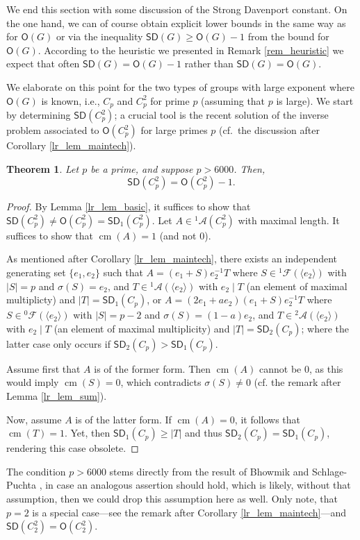 \documentclass{amsart}
\newtheorem{thm}{Theorem}[section]
\theoremstyle{definition}
\numberwithin{equation}{section}
\begin{document}
We end this section with some discussion of the Strong Davenport constant.
On the one hand, we can of course obtain explicit lower bounds in the
same way as for ${\mathsf{O}}(G)$ or via the inequality ${\mathsf{SD}}(G)\ge {\mathsf{O}}(G)-1$
from the bound for ${\mathsf{O}}(G)$.
According to the heuristic we presented in Remark \ref{rem_heuristic} we expect that
often ${\mathsf{SD}}(G)= {\mathsf{O}}(G)-1$ rather than ${\mathsf{SD}}(G)={\mathsf{O}}(G)$.

We elaborate on this point for the two types of groups with large exponent
where ${\mathsf{O}}(G)$ is known, i.e., $C_p$ and $C_p^2$ for prime $p$ (assuming that $p$ is large).
We start by determining ${\mathsf{SD}}(C_p^2)$; a crucial tool is the
recent solution of the inverse problem associated to
${\mathsf{O}}(C_p^2)$ for large primes $p$ (cf.~the discussion after Corollary \ref{lr_lem_maintech}).

\begin{thm}
Let $p$ be a prime, and suppose $p>6000$.
Then,
\[{\mathsf{SD}}(C_p^2)= {\mathsf{O}}(C_p^2)-1.\]
\end{thm}
\begin{proof}
By Lemma \ref{lr_lem_basic}, it suffices to show that
${\mathsf{SD}}(C_p^2)\neq {\mathsf{O}}(C_p^2)={\mathsf{SD}}_1(C_p^2)$.
Let $A\in {{}^{{1}}\!\mathcal{A}}(C_p^2)$ with maximal length.
It suffices to show that $\operatorname{cm}(A)=1$ (and not $0$).

As mentioned after Corollary \ref{lr_lem_maintech}, there exists an independent
generating set $\{ e_1, e_2\}$
such that $A= (e_1 + S)e_2^{-1}T$ where $S \in {{}^{{1}}\!\mathcal{F}}( \langle e_2 \rangle )$
with $|S|=p$ and $\sigma(S)=e_2$, and
$T\in {{}^{{1}}\!\mathcal{A}}(\langle e_2 \rangle)$ with $e_2\mid T$ (an element of maximal multiplicty) and $|T|={\mathsf{SD}}_1(C_p)$,
or $A=(2e_1+ae_2)(e_1+S)e_2^{-1}T$ where
$S \in {{}^{{0}}\!\mathcal{F}}( \langle e_2 \rangle )$
with $|S|=p-2$ and $\sigma(S)=(1-a)e_2$, and
$T\in {{}^{{2}}\!\mathcal{A}}(\langle e_2 \rangle)$ with $e_2\mid T$ (an element of maximal multiplicity) and $|T|={\mathsf{SD}}_2(C_p)$;
where the latter case only occurs if ${\mathsf{SD}}_2(C_p)> {\mathsf{SD}}_1(C_p)$.

Assume first that $A$ is of the former form.
Then $\operatorname{cm}(A)$ cannot be $0$, as this would imply $\operatorname{cm}(S)=0$, which contradicts
$\sigma(S)\neq 0 $ (cf. the remark after Lemma \ref{lr_lem_sum}).

Now, assume $A$ is of the latter form.
If $\operatorname{cm}(A)=0$, it follows that $\operatorname{cm}(T)=1$. Yet, then ${\mathsf{SD}}_1(C_p)\ge |T|$ and
thus ${\mathsf{SD}}_2(C_p)={\mathsf{SD}}_1(C_p)$, rendering this case obsolete.
\end{proof}
The condition $p>6000$ stems directly from the result of Bhowmik and
Schlage-Puchta \cite{bhowmik}, in case an analogous assertion should hold, which is likely,
without that assumption, then we could drop this assumption here as well.
Only note, that $p=2$ is a special case---see the remark
after Corollary \ref{lr_lem_maintech}---and ${\mathsf{SD}}(C_2^2)={\mathsf{O}}(C_2^2)$.
\end{document}
